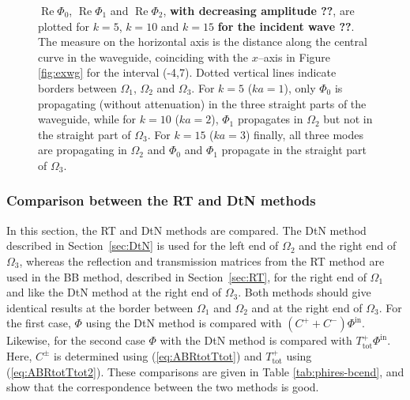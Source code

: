 \documentclass[numreferences]{kluwer}
\renewcommand{\Phi}{\varPhi}
\renewcommand{\Re}{\operatorname{Re}}
\renewcommand{\vec}[1]{\bm{#1}}
\renewcommand{\Phi}{\varPhi}
\newcommand{\Phiin}{\vec\Phi^{\text{in}}}
\newcommand{\Ttot}{T^+_{\text{tot}}}
\begin{document}
\begin{figure}[htb]
  \caption{$\Re\Phi_0$, $\Re\Phi_1$ and $\Re\Phi_2$, \textbf{with decreasing amplitude ??}, are plotted for $k=5$,
    $k=10$ and $k=15$ \textbf{for the incident wave ??}. The measure on the horizontal axis is the
    distance along the central curve in the waveguide, coinciding with the $x$--axis in Figure \ref{fig:exwg} for the interval (-4,7). Dotted vertical
    lines indicate borders between $\Omega_1$, $\Omega_2$ and
    $\Omega_3$. For $k=5$ ($ka=1$), only $\Phi_0$ is propagating
    (without attenuation) in the three straight parts of the
    waveguide, while for $k=10$ ($ka=2$), $\Phi_1$ propagates in
    $\Omega_2$ but not in the straight part of $\Omega_3$. For $k=15$
    ($ka=3$) finally, all three modes are propagating in $\Omega_2$
    and $\Phi_0$ and $\Phi_1$ propagate in the straight part of
    $\Omega_3$.}
  \label{fig:phi}
\end{figure}

\subsubsection{Comparison between the RT and DtN methods}
\label{sec:RT-DtN}

In this section, the RT and DtN methods are compared. The DtN method described in Section~\ref{sec:DtN} is used for the left end of $\Omega_2$ and the right end of $\Omega_3$, whereas the reflection and transmission matrices from the RT method are used in the BB method, described in Section~\ref{sec:RT}, for the right end of $\Omega_1$  and like the DtN method at the right end of $\Omega_3$. Both methods should give identical results at the border between $\Omega_1$ and $\Omega_2$ and at the right end of $\Omega_3$. For the first case, $\vec\Phi$ using the DtN method is compared with $(C^++C^-)\Phiin$. Likewise, for the second case $\vec\Phi$ with the DtN method is compared with $\Ttot\Phiin$. Here, $C^{\pm}$ is determined using (\ref{eq:ABRtotTtot}) and $\Ttot$ using (\ref{eq:ABRtotTtot2}). These comparisons are given in Table \ref{tab:phires-bcend}, and show that the correspondence between the two methods is good.
 
\end{document}
